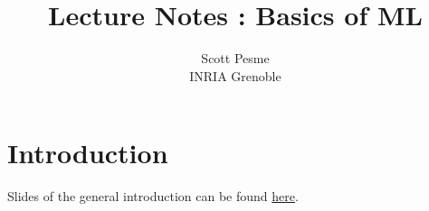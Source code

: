 \documentclass[11pt]{article}
\title{Lecture Notes : Basics of ML}
\author{Scott Pesme \\ \small INRIA Grenoble}
\begin{document}
\maketitle
\tableofcontents

\newpage

\section{Introduction}
Slides of the general introduction can be found \href{https://kernel-learning.github.io/docs/intro.pdf}{here}.







\newpage
\appendix


\end{document}

